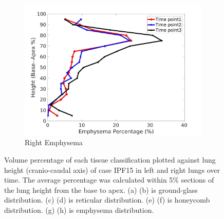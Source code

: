 \begin{figure}[H]
\begin{subfigure}{.42\linewidth}
  \includegraphics[width=\linewidth,trim={{.0\wd0} {.0\wd0} {.0\wd0} {.0\wd0}},clip]{Appendix/Image_AppexA/BaseToApex/IPF15RightLungEmphysemaDiseaseAgainstHeight.jpg}
  \caption{Right Emphysema}
  \label{fig:IPF15DiseaseAgainstHeight-h}
\end{subfigure}
\caption{Volume percentage of each tissue classification plotted against lung height (cranio-caudal axis) of case IPF15 in left and right lungs over time. The average percentage was calculated within 5\% sections of the lung height from the base to apex. (a) (b) is ground-glass distribution. (c) (d) is reticular distribution. (e) (f) is honeycomb distribution. (g) (h) is emphysema distribution.}
\label{fig:IPF15DiseaseAgainstHeight}
\end{figure}

